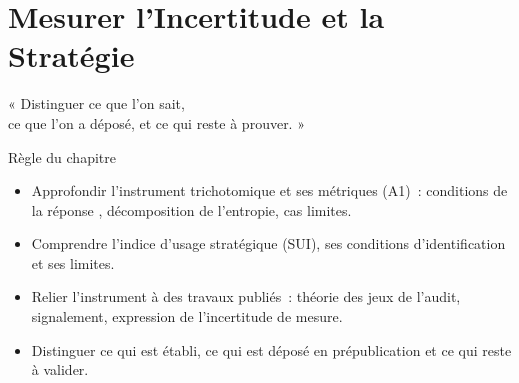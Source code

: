 
\chapter{Mesurer l'Incertitude et la Stratégie}
\label{chap:incertitude}

\epigraph{%
    « Distinguer ce que l'on sait,\\
    ce que l'on a déposé, et ce qui reste à prouver. »%
}{Règle du chapitre}


\begin{boxobjectifs}
\begin{itemize}
    \item Approfondir l'instrument trichotomique et ses métriques (A1)~:
          conditions de la réponse \NEK{}, décomposition de l'entropie, cas
          limites.
    \item Comprendre l'indice d'usage stratégique (SUI), ses conditions
          d'identification et ses limites.
    \item Relier l'instrument à des travaux publiés~: théorie des jeux de
          l'audit, signalement, expression de l'incertitude de mesure.
    \item Distinguer ce qui est établi, ce qui est déposé en prépublication
          et ce qui reste à valider.
\end{itemize}
\end{boxobjectifs}

